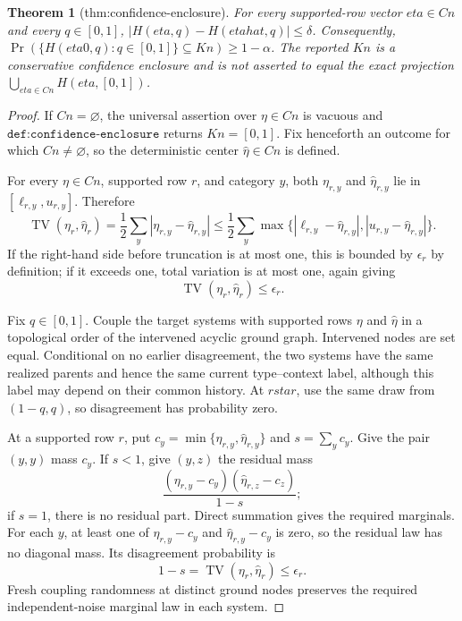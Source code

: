 \documentclass{article}
\newtheorem{theorem}{Theorem}
\begin{document}
\begin{theorem}[thm:confidence-enclosure]\label{thm:confidence-enclosure}
For every supported-row vector \(eta\in Cn\) and every \(q\in[0,1]\), \(|H(eta,q)-H(etahat,q)|\le\delta\). Consequently, \(\Pr(\{H(eta0,q):q\in[0,1]\}\subseteq Kn)\ge 1-\alpha\). The reported \(Kn\) is a conservative confidence enclosure and is not asserted to equal the exact projection \(\bigcup_{eta\in Cn}H(eta,[0,1])\).
\end{theorem}
\begin{proof}
If \(Cn=\varnothing\), the universal assertion over \(\eta\in Cn\) is vacuous and \(\texttt{def:confidence-enclosure}\) returns \(Kn=[0,1]\).  Fix henceforth an outcome for which \(Cn\neq\varnothing\), so the deterministic center \(\widehat\eta\in Cn\) is defined.

For every \(\eta\in Cn\), supported row \(r\), and category \(y\), both \(\eta_{r,y}\) and \(\widehat\eta_{r,y}\) lie in \([\ell_{r,y},u_{r,y}]\).  Therefore
\[
 \operatorname{TV}(\eta_r,\widehat\eta_r)
 =\frac12\sum_y|\eta_{r,y}-\widehat\eta_{r,y}|
 \leq \frac12\sum_y
 \max\{|\ell_{r,y}-\widehat\eta_{r,y}|,
          |u_{r,y}-\widehat\eta_{r,y}|\}.
\]
If the right-hand side before truncation is at most one, this is bounded by \(\epsilon_r\) by definition; if it exceeds one, total variation is at most one, again giving
\[
 \operatorname{TV}(\eta_r,\widehat\eta_r)\leq\epsilon_r.
\]

Fix \(q\in[0,1]\).  Couple the target systems with supported rows \(\eta\) and \(\widehat\eta\) in a topological order of the intervened acyclic ground graph.  Intervened nodes are set equal.  Conditional on no earlier disagreement, the two systems have the same realized parents and hence the same current type--context label, although this label may depend on their common history.  At \(rstar\), use the same draw from \((1-q,q)\), so disagreement has probability zero.

At a supported row \(r\), put \(c_y=\min\{\eta_{r,y},\widehat\eta_{r,y}\}\) and \(s=\sum_yc_y\).  Give the pair \((y,y)\) mass \(c_y\).  If \(s<1\), give \((y,z)\) the residual mass
\[
 \frac{(\eta_{r,y}-c_y)(\widehat\eta_{r,z}-c_z)}{1-s};
\]
if \(s=1\), there is no residual part.  Direct summation gives the required marginals.  For each \(y\), at least one of \(\eta_{r,y}-c_y\) and \(\widehat\eta_{r,y}-c_y\) is zero, so the residual law has no diagonal mass.  Its disagreement probability is
\[
 1-s=\operatorname{TV}(\eta_r,\widehat\eta_r)\leq\epsilon_r.
\]
Fresh coupling randomness at distinct ground nodes preserves the required independent-noise marginal law in each system.


\end{proof}
\end{document}
